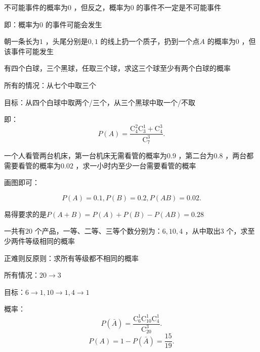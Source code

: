 \begin{notation}
    不可能事件的概率为$0$ ，但反之，概率为$0$ 的事件不一定是不可能事件

    即：概率为$0$ 的事件可能会发生
\end{notation}
\begin{eg}
    朝一条长为$1$ ，头尾分别是$0,1$ 的线上扔一个质子，扔到一个点$A$ 的概率为$0$ ，但该事件可能发生
\end{eg}
\begin{eg}
    有四个白球，三个黑球，任取三个球，求这三个球至少有两个白球的概率

    所有的情况：从七个中取三个

    目标：从四个白球中取两个/三个，从三个黑球中取一个/不取

    即：\[
        P\left( A \right) =\frac{\mathrm{C}_{4}^{2}\mathrm{C}_{3}^{1}+\mathrm{C}_{4}^{3}}{\mathrm{C}_{7}^{3}}
    .\] 
\end{eg}
\begin{eg}
    一个人看管两台机床，第一台机床无需看管的概率为$0.9$ ，第二台为$0.8$ ，两台都需要看管的概率为$0.02$ ，求一小时内至少一台需要看管的概率

    画图即可：
    \begin{center}
    \end{center}
    \[
        P\left( A \right) =0.1,P\left( B \right) =0.2,P\left( AB \right) =0.02
    .\] 
    
    易得要求的是$P\left( A+B \right) =P\left( A \right) +P\left( B \right) -P\left( AB \right) =0.28$
\end{eg}
\begin{eg}
    一共有$20$ 个产品，一等、二等、三等个数分别为：$6,10,4$ ，从中取出$3$ 个，求至少两件等级相同的概率

    正难则反原则：求所有等级都不相同的概率

    所有情况：$20\to 3$

    目标：$6\to 1,10\to 1,4\to 1$ 

    概率：
     \[
        P\left( \bar{A} \right) =\frac{\mathrm{C}_{6}^{1}\mathrm{C}_{10}^{1}\mathrm{C}_{4}^{1}}{\mathrm{C}_{20}^{3}}
    .\] 
     \[
        P\left( A \right) =1-P\left( \bar{A} \right) =\frac{15}{19}
    .\] 

\end{eg}
